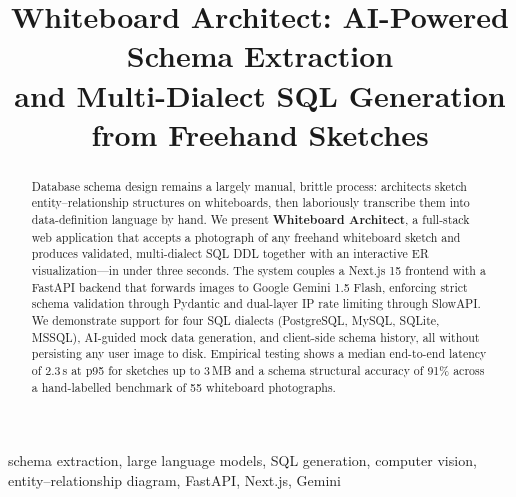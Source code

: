 \documentclass[conference]{IEEEtran}
\begin{document}
\title{Whiteboard Architect: AI-Powered Schema Extraction\\
and Multi-Dialect SQL Generation from Freehand Sketches}

\author{
  \and
}

\maketitle

\begin{abstract}
Database schema design remains a largely manual, brittle process: architects
sketch entity--relationship structures on whiteboards, then laboriously
transcribe them into data-definition language by hand. We present
\textbf{Whiteboard Architect}, a full-stack web application that accepts
a photograph of any freehand whiteboard sketch and produces validated,
multi-dialect SQL DDL together with an interactive ER visualization---in
under three seconds. The system couples a Next.js 15 frontend with a
FastAPI backend that forwards images to Google Gemini 1.5 Flash, enforcing
strict schema validation through Pydantic and dual-layer IP rate limiting
through SlowAPI. We demonstrate support for four SQL dialects (PostgreSQL,
MySQL, SQLite, MSSQL), AI-guided mock data generation, and client-side
schema history, all without persisting any user image to disk. Empirical
testing shows a median end-to-end latency of 2.3\,s at p95 for sketches
up to \mbox{3\,MB} and a schema structural accuracy of 91\% across a
hand-labelled benchmark of 55 whiteboard photographs.
\end{abstract}

\begin{IEEEkeywords}
schema extraction, large language models, SQL generation, computer vision,
entity--relationship diagram, FastAPI, Next.js, Gemini
\end{IEEEkeywords}

\end{document}
